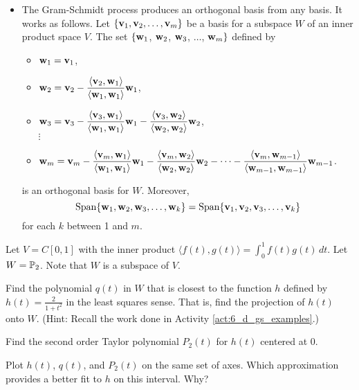 \label{sec:gram_schmidt_summ}
\begin{itemize}
\item The Gram-Schmidt process produces an orthogonal basis from any basis. It works as follows. Let $\{\mathbf{v}_1, \mathbf{v}_2, \ldots, \mathbf{v}_m\}$ be a basis for a subspace $W$ of an inner product space $V$. The set $\{\mathbf{w}_1$, $\mathbf{w}_2$, $\mathbf{w}_3$, $\ldots$, $\mathbf{w}_{m}\}$ defined by
\begin{itemize}
\item $\mathbf{w}_1 = \mathbf{v}_1$,
\item $\mathbf{w}_2 = \mathbf{v}_2 - \displaystyle \frac{\langle \mathbf{v}_2, \mathbf{w}_1 \rangle}{\langle \mathbf{w}_1, \mathbf{w}_1 \rangle} \mathbf{w}_1$,
\item $\mathbf{w}_3 =  \mathbf{v}_3 - \displaystyle \frac{\langle \mathbf{v}_3, \mathbf{w}_1 \rangle}{\langle \mathbf{w}_1, \mathbf{w}_1 \rangle} \mathbf{w}_1 - \frac{\langle \mathbf{v}_3, \mathbf{w}_2 \rangle}{\langle \mathbf{w}_2, \mathbf{w}_2 \rangle} \mathbf{w}_2$, \\
\qquad $\vdots$
\item $\mathbf{w}_m = \mathbf{v}_m - \displaystyle \frac{\langle \mathbf{v}_m, \mathbf{w}_1 \rangle}{\langle \mathbf{w}_1, \mathbf{w}_1 \rangle} \mathbf{w}_1 - \frac{\langle \mathbf{v}_m, \mathbf{w}_2 \rangle}{\langle \mathbf{w}_2, \mathbf{w}_2 \rangle} \mathbf{w}_2 - \cdots - \frac{\langle \mathbf{v}_m, \mathbf{w}_{m-1} \rangle}{\langle \mathbf{w}_{m-1}, \mathbf{w}_{m-1} \rangle} \mathbf{w}_{m-1}$.
\end{itemize}
is an orthogonal basis for $W$. Moreover,
\[\text{Span}\{\mathbf{w}_1, \mathbf{w}_2, \mathbf{w}_3, \ldots, \mathbf{w}_{k}\} = \text{Span}\{\mathbf{v}_1,\mathbf{v}_2,\mathbf{v}_3, \ldots, \mathbf{v}_{k}\}\]
for each $k$ between 1 and $m$.
\end{itemize}



\label{sec:gram_schmidt_exer}
\be

\item Let $V = C[0,1]$ with the inner product $\langle f(t), g(t) \rangle = \int_0^1 f(t) g(t) \, dt$. Let $W = \mathbb{P}_2$. Note that $W$ is a subspace of $V$. 
	\ba
	\item Find the polynomial $q(t)$ in $W$ that is closest to the function $h$ defined by $h(t) = \frac{2}{1+t^2}$ in the least squares sense. That is, find the projection of $h(t)$ onto $W$. (Hint: Recall the work done in Activity \ref{act:6_d_gs_examples}.) 
	
	\item Find the second order Taylor polynomial $P_2(t)$ for $h(t)$ centered at 0. 

	\item Plot $h(t)$, $q(t)$, and $P_2(t)$ on the same set of axes. Which approximation provides a better fit to $h$ on this interval. Why?
	
